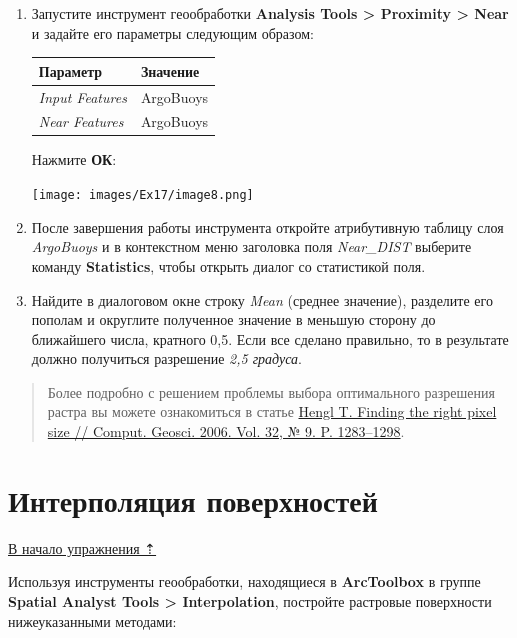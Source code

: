 \documentclass[12pt,]{book}
\begin{document}
\begin{enumerate}
\def\labelenumi{\arabic{enumi}.}
\item
  Запустите инструмент геообработки \textbf{Analysis Tools \textgreater{} Proximity \textgreater{} Near} и задайте его параметры следующим образом:

  \begin{longtable}[]{@{}ll@{}}
  \toprule
  Параметр & Значение\tabularnewline
  \midrule
  \endhead
  \emph{Input Features} & ArgoBuoys\tabularnewline
  \emph{Near Features} & ArgoBuoys\tabularnewline
  \bottomrule
  \end{longtable}

  Нажмите \textbf{ОК}:

  \texttt{[image: images/Ex17/image8.png]}
\item
  После завершения работы инструмента откройте атрибутивную таблицу слоя \emph{ArgoBuoys} и в контекстном меню заголовка поля \emph{Near\_DIST} выберите команду \textbf{Statistics}, чтобы открыть диалог со статистикой поля.
\item
  Найдите в диалоговом окне строку \emph{Mean} (среднее значение), разделите его пополам и округлите полученное значение в меньшую сторону до ближайшего числа, кратного 0,5. Если все сделано правильно, то в результате должно получиться разрешение \emph{2,5 градуса}.
\end{enumerate}

\begin{quote}
Более подробно с решением проблемы выбора оптимального разрешения растра вы можете ознакомиться в статье \href{https://www.researchgate.net/publication/222014409_Finding_the_right_pixel_size}{Hengl T. Finding the right pixel size // Comput. Geosci. 2006. Vol. 32, № 9. P. 1283--1298}.
\end{quote}

\hypertarget{interpolation-surfaces}{%
\section{Интерполяция поверхностей}\label{interpolation-surfaces}}

\protect\hyperlink{interpolation}{В начало упражнения ⇡}

Используя инструменты геообработки, находящиеся в \textbf{ArcToolbox} в группе \textbf{Spatial Analyst Tools \textgreater{} Interpolation}, постройте растровые поверхности нижеуказанными методами:
\end{document}
